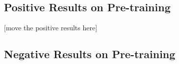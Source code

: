 \subsection{Positive Results on Pre-training}
[move the positive results here]

\subsection{Negative Results on Pre-training}
\citep{hansen2023pretrainingvisuomotorcontrolrevisiting}

\citep{schneider2025surprisingineffectivenesspretrainedvisual}

\citep{dasari2023unbiasedlookdatasetsvisuomotor}
